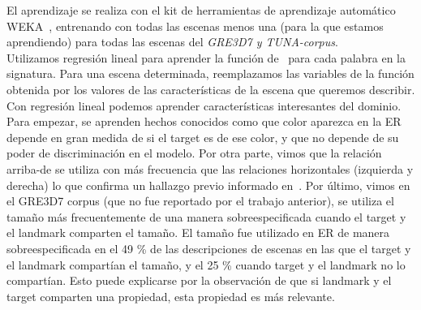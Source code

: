 

El aprendizaje se realiza con el kit de herramientas de aprendizaje autom\'atico
WEKA~\cite{Hall:WEK09}, entrenando con todas las escenas menos una (para la que estamos aprendiendo) para todas las escenas del \textit{GRE3D7 y TUNA-corpus}. \\

Utilizamos regresi\'on lineal para aprender la funci\'on de
\puse\ para cada palabra en la signatura. Para una escena determinada, reemplazamos
las variables de la funci\'on obtenida por los valores de las caracter\'{i}sticas
de la escena que queremos describir.\\

Con regresi\'on lineal podemos aprender caracter\'{i}sticas interesantes
 del dominio. Para empezar, se aprenden hechos conocidos
como que color aparezca en la ER depende en gran medida de si el
target es de ese color, y que no depende de su
poder de discriminaci\'on en el modelo. Por otra parte, vimos que la relaci\'on arriba-de
 se utiliza con m\'as frecuencia que las relaciones horizontales
(izquierda y derecha) lo que confirma un hallazgo previo informado
en~\cite{viet:gene11}. Por \'ultimo, vimos en el
GRE3D7 corpus (que no fue reportado por el trabajo anterior), se utiliza el tama\~no
m\'as frecuentemente de una manera sobreespecificada cuando el
target y el landmark comparten el tama\~no. El tama\~no fue utilizado en ER de manera sobreespecificada en el 49 \% de
las descripciones de escenas en las que el target y el landmark compart\'ian el tama\~no,
y el 25 \% cuando target y el landmark no lo compart\'ian. Esto puede explicarse por la observaci\'on de que si landmark y el target comparten una propiedad, esta propiedad es m\'as relevante.



